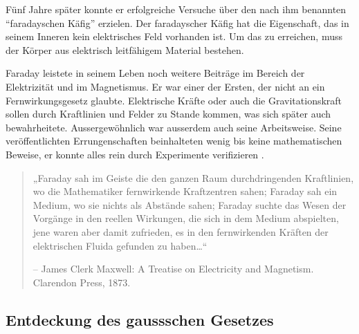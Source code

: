 Fünf Jahre später konnte er erfolgreiche Versuche über den nach ihm benannten ``faradayschen Käfig'' erzielen.
Der faradayscher Käfig hat die Eigenschaft, das in seinem Inneren kein elektrisches Feld vorhanden ist.
Um das zu erreichen, muss der Körper aus elektrisch leitfähigem Material bestehen.

Faraday leistete in seinem Leben noch weitere Beiträge im Bereich der Elektrizität und im Magnetismus. 
Er war einer der Ersten, der nicht an ein Fernwirkungsgesetz glaubte.
Elektrische Kräfte oder auch die Gravitationskraft sollen durch Kraftlinien und Felder zu Stande kommen, was sich später auch bewahrheitete.
Aussergewöhnlich war ausserdem auch seine Arbeitsweise.
Seine veröffentlichten Errungenschaften beinhalteten wenig bis keine mathematischen Beweise, er konnte alles rein durch Experimente verifizieren \cite{maxwell:Michael_Faraday}.
\begin{quote}
	„Faraday sah im Geiste die den ganzen Raum durchdringenden Kraftlinien, wo die Mathematiker fernwirkende Kraftzentren sahen; Faraday sah ein Medium, wo sie nichts als Abstände sahen; Faraday suchte das Wesen der Vorgänge in den reellen Wirkungen, die sich in dem Medium abspielten, jene waren aber damit zufrieden, es in den fernwirkenden Kräften der elektrischen Fluida gefunden zu haben…“
	
	– James Clerk Maxwell: A Treatise on Electricity and Magnetism. Clarendon Press, 1873.
\end{quote}

\subsection{Entdeckung des gaussschen Gesetzes}

